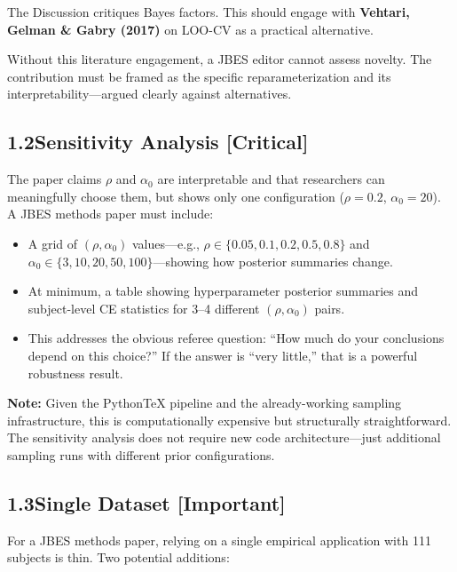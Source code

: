\documentclass[12pt,a4paper]{article}
\begin{document}
The Discussion critiques Bayes factors.  This should engage with
\textbf{Vehtari, Gelman \& Gabry (2017)} on LOO-CV as a practical alternative.

\medskip

Without this literature engagement, a JBES editor cannot assess novelty.  The
contribution must be framed as the specific reparameterization and its
interpretability---argued clearly against alternatives.

\subsection{1.2\quad Sensitivity Analysis [Critical]}

The paper claims $\rho$ and $\alpha_0$ are interpretable and that researchers
can meaningfully choose them, but shows only one configuration ($\rho = 0.2$,
$\alpha_0 = 20$).  A JBES methods paper must include:

\begin{itemize}[leftmargin=1.5em]
\item A grid of $(\rho, \alpha_0)$ values---e.g., $\rho \in \{0.05, 0.1, 0.2,
0.5, 0.8\}$ and $\alpha_0 \in \{3, 10, 20, 50, 100\}$---showing how posterior
summaries change.

\item At minimum, a table showing hyperparameter posterior summaries and
subject-level CE statistics for 3--4 different $(\rho, \alpha_0)$ pairs.

\item This addresses the obvious referee question: ``How much do your
conclusions depend on this choice?''  If the answer is ``very little,'' that is
a powerful robustness result.
\end{itemize}

\textbf{Note:} Given the PythonTeX pipeline and the already-working sampling
infrastructure, this is computationally expensive but structurally
straightforward.  The sensitivity analysis does not require new code
architecture---just additional sampling runs with different prior
configurations.

\subsection{1.3\quad Single Dataset [Important]}

For a JBES methods paper, relying on a single empirical application with 111
subjects is thin.  Two potential additions:
\end{document}
